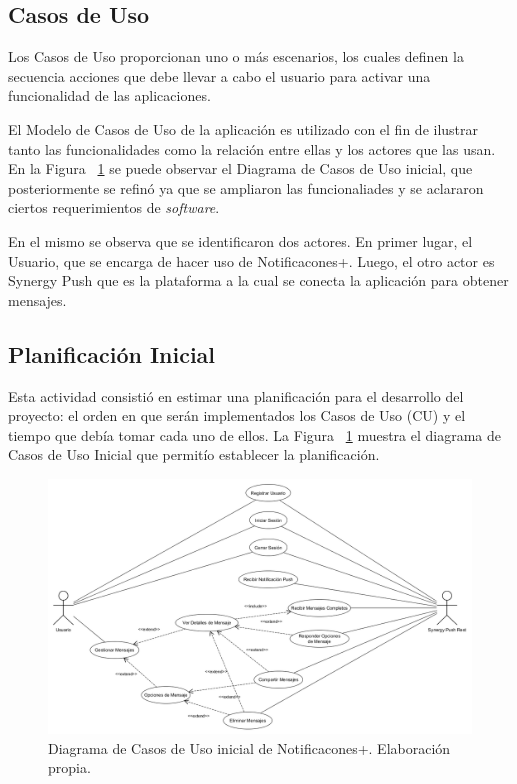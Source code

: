 \subsection{Casos de Uso}

Los Casos de Uso proporcionan uno o más escenarios, los cuales definen la secuencia acciones que debe llevar a cabo el usuario para activar una funcionalidad de las aplicaciones.

El Modelo de Casos de Uso de la aplicación es utilizado con el fin de ilustrar tanto las funcionalidades como la relación entre ellas y los actores que las usan. En la Figura ~\ref{fig:dcuinicial} se puede observar el Diagrama de Casos de Uso inicial, que posteriormente se refinó ya que se ampliaron las funcionaliades y se aclararon ciertos requerimientos de \textit{software}.

En el mismo se observa que se identificaron dos actores. En primer lugar, el Usuario, que se encarga de hacer uso de Notificacones+. Luego, el otro actor es Synergy Push que es la plataforma a la cual se conecta la aplicación para obtener mensajes.


\subsection{Planificación Inicial}

Esta actividad consistió en estimar una planificación para el desarrollo del proyecto: el orden en que serán implementados los Casos de Uso (CU) y el tiempo que debía tomar cada uno de ellos. La Figura ~\ref{fig:dcuinicial} muestra el diagrama de Casos de Uso Inicial que permitío establecer la planificación. 

\begin{figure}[ht]
  \centering
  \includegraphics[scale=0.3,type=png,ext=.png,read=.png,angle=0,origin=c]{imagenes/Diagrama_de_Casos_de_Uso_v1_5}
  \caption{Diagrama de Casos de Uso inicial de Notificacones+. Elaboración propia.}
  \label{fig:dcuinicial}
\end{figure}


